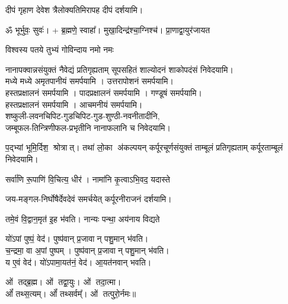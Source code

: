 \begin{center}
{दीपं गृहाण देवेश त्रैलोक्यतिमिरापह}
\devAya{} दीपं दर्शयामि।\\
\medskip

ॐ भूर्भुवः॒ सुवः॑। + ब्र॒ह्मणे॒ स्वाहा᳚।
{मुखा॒दिन्द्र॑श्चा॒ग्निश्च॑। प्रा॒णाद्वा॒युर॑जायत}


{विश्वस्य पतये तुभ्यं गोविन्दाय नमो नमः}

{नानापक्वान्नसंयुक्तं नैवेद्यं प्रतिगृह्यताम्}
\devAya{} सूपसहितं शाल्योदनं शाकोपदंसं निवेदयामि।\\
मध्ये मध्ये अमृतपानीयं समर्पयामि । उत्तरापोशनं समर्पयामि।\\
हस्तप्रक्षालनं समर्पयामि । पादप्रक्षालनं समर्पयामि । गण्डूषं समर्पयामि।\\
हस्तप्रक्षालनं समर्पयामि । आचमनीयं समर्पयामि।\\
\devAya{} शष्कुली-लवनचिपिट-गुडचिपिट-गुड-शुण्ठी-नवनीतादीनि,\\
जम्बूफल-तिन्त्रिणीफल-प्रभृतीनि नानाफलानि च निवेदयामि।
\medskip

{प॒द्भ्यां भूमि॒र्दिश॒ श्रोत्रात्। तथा॑ लो॒का अ॑कल्पयन्}
{कर्पूरचूर्णसंयुक्तं ताम्बूलं प्रतिगृह्यताम्}
\devAya{} कर्पूरताम्बूलं निवेदयामि।\\
\medskip


{सर्वा॑णि रू॒पाणि॑ वि॒चित्य॒ धीर॑। नामा॑नि कृ॒त्वाऽभि॒वद॒\an{} यदास्ते}

{जय-मङ्गल-निर्घोषैर्देवदेवं समर्चयेत्}
\devAya{} कर्पूरनीराजनं दर्शयामि।\\
\medskip

{तमे॒वं वि॒द्वान॒मृत॑ इ॒ह भ॑वति। नान्यः पन्था॒ अय॑नाय विद्यते}

यो॑ऽपां पुष्पं॒ वेद॑। पुष्प॑वान् प्र॒जावान् पशु॒मान् भ॑वति।\\
च॒न्द्रमा॒ वा अ॒पां पुष्पम्। पुष्प॑वान् प्र॒जावान् पशु॒मान् भ॑वति।\\
य ए॒वं वेद॑। यो॑ऽपामा॒यत॑नं॒ वेद॑। आ॒यत॑नवान् भवति।\medskip

ओं तद्ब्र॒ह्म। ओं तद्वा॒युः। ओं तदा॒त्मा।\\ ओं᳚ तथ्स॒त्यम्‌।
ओं᳚ तथ्सर्वम्᳚‌। ओं तत्पुरो॒र्नमः॥\medskip


\end{center}
